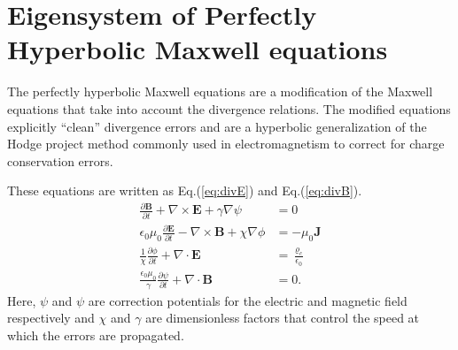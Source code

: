 \documentclass[11pt, reqno]{amsart}
\newcommand{\eqr}[1]{Eq.\thinspace(#1)}
\newcommand{\pfrac}[2]{\frac{\partial #1}{\partial #2}}
\newcommand{\mvec}[1]{\mathbf{#1}}
\theoremstyle{definition}
\begin{document}
\section{Eigensystem of Perfectly Hyperbolic Maxwell equations}

The perfectly hyperbolic Maxwell equations are a modification of the
Maxwell equations that take into account the divergence relations. The
modified equations explicitly ``clean'' divergence errors and are a
hyperbolic generalization of the Hodge project method commonly used in
electromagnetism to correct for charge conservation
errors\cite{munz_2000, munz_2000b, munz_2000c}.

These equations are written as
\eqr{\ref{eq:divE}} and \eqr{\ref{eq:divB}}.
\begin{align}
  \frac{\partial \mvec{B}}{\partial t} + \nabla\times\mvec{E} +
  \gamma \nabla\psi
  &= 0 \\
  \epsilon_0\mu_0\frac{\partial \mvec{E}}{\partial t} -
  \nabla\times\mvec{B} +     \chi \nabla \phi
  &= -\mu_0\mvec{J} \\
  \frac{1}{\chi}\pfrac{\phi}{t} + \nabla\cdot\mvec{E} 
  &= \frac{\varrho_c}{\epsilon_0} \\
  \frac{\epsilon_0\mu_0}{\gamma}\pfrac{\psi}{t} + \nabla\cdot\mvec{B} 
  &= 0.
\end{align}
Here, $\psi$ and $\psi$ are correction potentials for the electric and
magnetic field respectively and $\chi$ and $\gamma$ are dimensionless
factors that control the speed at which the errors are propagated.
\end{document}
